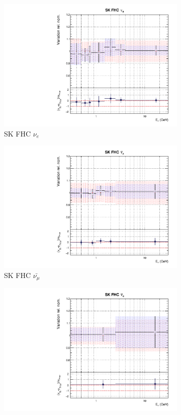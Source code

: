 \begin{figure}[t]
\begin{subfigure}{0.24\textwidth}
  \includegraphics[width=0.95\linewidth]{figs/rhcmpdat248flux_9}
  \caption{SK FHC $\nu_e$}
  \label{fig:}
\end{subfigure}
\begin{subfigure}{0.24\textwidth}
  \centering
  \includegraphics[width=0.95\linewidth]{figs/rhcmpdat248flux_10}
  \caption{SK FHC $\bar{\nu_{\mu}}$}
  \label{fig:}
\end{subfigure}
\begin{subfigure}{0.24\textwidth}
  \centering
  \includegraphics[width=0.95\linewidth]{figs/rhcmpdat248flux_11}

\end{subfigure}
\end{figure}

